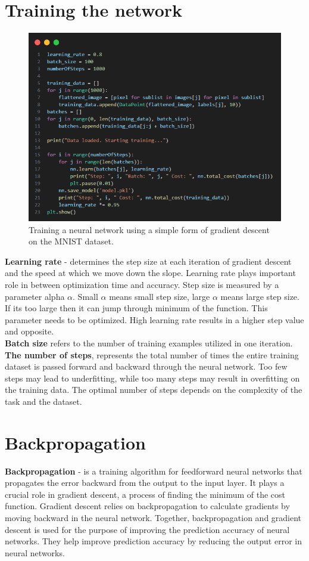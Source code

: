 \documentclass{article}
\begin{document}
\section{Training the network}
\begin{figure}[ht]
    \centering 
    \includegraphics[width=1\textwidth]{images/main.png}
    \caption{Training a neural network using a simple form of gradient descent on the MNIST dataset.}
    \label{fig:learn}
\end{figure}
\textbf{Learning rate} - determines the step size at each iteration of gradient descent and the speed at which we move down the slope. Learning rate plays important role in between optimization time and accuracy. Step size is measured by a parameter alpha $\alpha$. Small $\alpha$ means small step size, large $\alpha$ means large step size. If its too large then it can jump through minimum of the function. This parameter needs to be optimized. High learning rate results in a higher step value and opposite.\\ \textbf{Batch size} refers to the number of training examples utilized in one iteration. \\ \textbf{The number of steps}, represents the total number of times the entire training dataset is passed forward and backward through the neural network. Too few steps may lead to underfitting, while too many steps may result in overfitting on the training data. The optimal number of steps depends on the complexity of the task and the dataset.
\clearpage
\newpage
\section{Backpropagation}
\textbf{Backpropagation} - is a training algorithm for feedforward neural networks \cite{ffn_wiki} that propagates the error backward from the output to the input layer.
It plays a crucial role in gradient descent, a process of finding the minimum of the cost function. 
Gradient descent relies on backpropagation to calculate gradients by moving backward in the neural network.
Together, backpropagation and gradient descent is used for the purpose of improving the prediction accuracy of neural networks. 
They help improve prediction accuracy by reducing the output error in neural networks.
\end{document}
